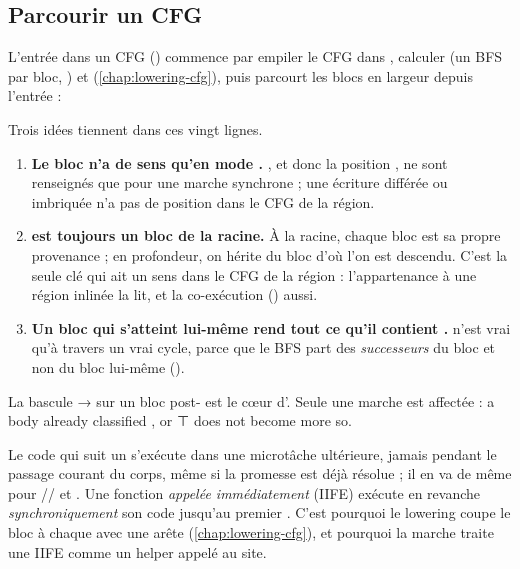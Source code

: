 \subsection{Parcourir un CFG}

L'entrée dans un CFG () commence par empiler le CFG dans , calculer  (un BFS par bloc, ) et  (\cref{chap:lowering-cfg}), puis parcourt les blocs en largeur depuis l'entrée :


Trois idées tiennent dans ces vingt lignes.
\begin{enumerate}
  \item \textbf{Le bloc n'a de sens qu'en mode .} , et donc la position , ne sont renseignés que pour une marche synchrone ; une écriture différée ou imbriquée n'a pas de position dans le CFG de la région.
  \item \textbf{ est toujours un bloc de la racine.} À la racine, chaque bloc est sa propre provenance ; en profondeur, on hérite du bloc d'où l'on est descendu. C'est la seule clé qui ait un sens dans le CFG de la région : l'appartenance à une région inlinée la lit, et la co-exécution () aussi.
  \item \textbf{Un bloc qui s'atteint lui-même rend tout ce qu'il contient .}  n'est vrai qu'à travers un vrai cycle, parce que le BFS part des \emph{successeurs} du bloc et non du bloc lui-même ().
\end{enumerate}

La bascule  →  sur un bloc post- est le cœur d'. Seule une marche  est affectée : \og a body already classified ,  or ⊤ does not become more so\fg{}.

\begin{react}
Le code qui suit un  s'exécute dans une microtâche ultérieure, jamais pendant le passage courant du corps, même si la promesse est déjà résolue ; il en va de même pour // et . Une fonction  \emph{appelée immédiatement} (IIFE) exécute en revanche \emph{synchroniquement} son code jusqu'au premier . C'est pourquoi le lowering coupe le bloc à chaque  avec une arête  (\cref{chap:lowering-cfg}), et pourquoi la marche traite une IIFE comme un helper appelé au site.
\end{react}

